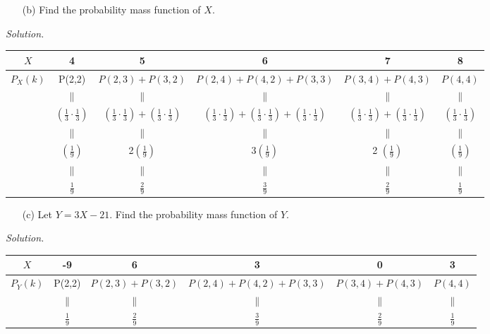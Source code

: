 \documentclass[12pt]{report}
\begin{document}
\begin{itemize}
\item [(b)] Find the probability mass function of $X$.			%
\end{itemize}
\textit{Solution. } \\
\begin{tabular}{|c|c|c|c|c|c|}
$X$ & 4 & 5 & 6 & 7 & 8\\
\hline
$P_X(k)$ & P(2,2) & $P(2,3)+P(3,2)$ & $P(2,4)+P(4,2)+P(3,3)$ & $P(3,4)+P(4,3)$ & $P(4,4)$\\
 & $\parallel$ & $\parallel$ & $\parallel$ & $\parallel$ & $\parallel$ \\
 & $\left(\frac{1}{3}\cdot\frac{1}{3}\right)$ & $\left(\frac{1}{3}\cdot\frac{1}{3}\right)+\left(\frac{1}{3}\cdot\frac{1}{3}\right)$ & $\left(\frac{1}{3}\cdot\frac{1}{3}\right)+\left(\frac{1}{3}\cdot\frac{1}{3}\right)+\left(\frac{1}{3}\cdot\frac{1}{3}\right)$ & $\left(\frac{1}{3}\cdot\frac{1}{3}\right)+\left(\frac{1}{3}\cdot\frac{1}{3}\right)$ & $\left(\frac{1}{3}\cdot\frac{1}{3}\right)$ \\
 & $\parallel$ & $\parallel$ & $\parallel$ & $\parallel$ & $\parallel$ \\
 & $\left(\frac{1}{9}\right)$ & 2$\left(\frac{1}{9}\right)$ & 3$\left(\frac{1}{9}\right)$ & 2 $\left(\frac{1}{9}\right)$ & $\left(\frac{1}{9}\right)$\\
 & $\parallel$ & $\parallel$ & $\parallel$ & $\parallel$ & $\parallel$ \\
 & $\frac{1}{9}$ & $\frac{2}{9}$ & $\frac{3}{9}$ & $\frac{2}{9}$ & $\frac{1}{9}$\\
\end{tabular}

\begin{itemize}
\item [(c)] Let $Y=3X-21$. Find the probability mass function of $Y$.			%
\end{itemize}
\textit{Solution. } \\
\begin{tabular}{|c|c|c|c|c|c|}
$X$ & -9 & 6 & 3 & 0 & 3 \\
\hline
$P_Y(k)$ & P(2,2) & $P(2,3)+P(3,2)$ & $P(2,4)+P(4,2)+P(3,3)$ & $P(3,4)+P(4,3)$ & $P(4,4)$\\
 & $\parallel$ & $\parallel$ & $\parallel$ & $\parallel$ & $\parallel$ \\
 & $\frac{1}{9}$ & $\frac{2}{9}$ & $\frac{3}{9}$ & $\frac{2}{9}$ & $\frac{1}{9}$\\
\end{tabular}
\end{document}
